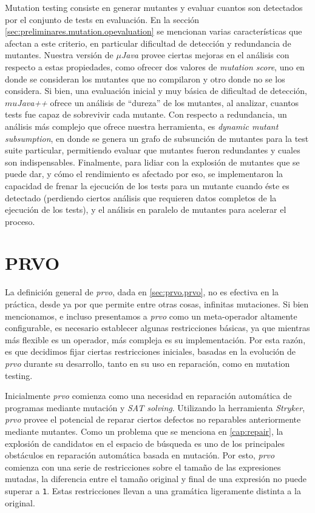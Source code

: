 Mutation testing consiste en generar mutantes y evaluar cuantos son detectados por el conjunto de tests en evaluaci\'on. En la secci\'on \ref{sec:preliminares.mutation.opevaluation} se mencionan varias caracter\'isticas que afectan a este criterio, en particular dificultad de detecci\'on y redundancia de mutantes. Nuestra versi\'on de \emph{$\mu$Java} provee ciertas mejoras en el an\'alisis con respecto a estas propiedades, como ofrecer dos valores de \emph{mutation score}, uno en donde se consideran los mutantes que no compilaron y otro donde no se los considera. Si bien, una evaluaci\'on inicial y muy b\'asica de dificultad de detecci\'on, \emph{$mu$Java++} ofrece un an\'alisis de ``dureza'' de los mutantes, al analizar, cuantos tests fue capaz de sobrevivir cada mutante. Con respecto a redundancia, un an\'alisis m\'as complejo que ofrece nuestra herramienta, es \emph{dynamic mutant subsumption}, en donde se genera un grafo de subsunci\'on de mutantes para la test suite particular, permitiendo evaluar que mutantes fueron redundantes y cuales son indispensables. Finalmente, para lidiar con la explosi\'on de mutantes que se puede dar, y c\'omo el rendimiento es afectado por eso, se implementaron la capacidad de frenar la ejecuci\'on de los tests para un mutante cuando \'este es detectado (perdiendo ciertos an\'alisis que requieren datos completos de la ejecuci\'on de los tests), y el an\'alisis en paralelo de mutantes para acelerar el proceso.

\section{PRVO}
\label{sec:implementation.prvo}

La definici\'on general de \emph{prvo}, dada en \ref{sec:prvo.prvo}, no es efectiva en la pr\'actica, desde ya por que permite entre otras cosas, infinitas mutaciones. Si bien mencionamos, e incluso presentamos a \emph{prvo} como un meta-operador altamente configurable, es necesario establecer algunas restricciones b\'asicas, ya que mientras m\'as flexible es un operador, m\'as compleja es su implementaci\'on. Por esta raz\'on, es que decidimos fijar ciertas restricciones iniciales, basadas en la evoluci\'on de \emph{prvo} durante su desarrollo, tanto en su uso en reparaci\'on, como en mutation testing.

Inicialmente \emph{prvo} comienza como una necesidad en reparaci\'on autom\'atica de programas mediante mutaci\'on y \emph{SAT solving}. Utilizando la herramienta \emph{Stryker}, \emph{prvo} provee el potencial de reparar ciertos defectos no reparables anteriormente mediante mutantes. Como un problema que se menciona en \ref{cap:repair}, la explosi\'on de candidatos en el espacio de b\'usqueda es uno de los principales obst\'aculos en reparaci\'on autom\'atica basada en mutaci\'on. Por esto, \emph{prvo} comienza con una serie de restricciones sobre el tama\~no de las expresiones mutadas, la diferencia entre el tama\~no original y final de una expresi\'on no puede superar a \texttt{1}. Estas restricciones llevan a una gram\'atica ligeramente distinta a la original.


